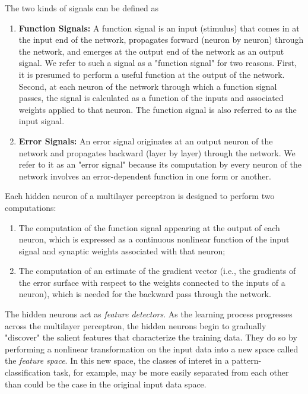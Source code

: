 \documentclass[twocolumn]{article}
\begin{document}
 The two kinds of signals can be defined as

 \begin{enumerate}
	 \item \textbf{Function Signals:} A function signal is an input (stimulus) that comes in at the input end of the network, propagates forward (neuron by neuron) through the network, and emerges at the output end of the network as an output signal. We refer to such a signal as a "function signal" for two reasons. First, it is presumed to perform a useful function at the output of the network. Second, at each neuron of the network through which a function signal passes, the signal is calculated as a function of the inputs and associated weights applied to that neuron. The function signal is also referred to as the input signal.
	 \item \textbf{Error Signals:} An error signal originates at an output neuron of the network and propagates backward (layer by layer) through the network. We refer to it as an "error signal" because its computation by every neuron of the network involves an error-dependent function in one form or another.
 \end{enumerate}

 Each hidden neuron of a multilayer perceptron is designed to perform two computations:

 \begin{enumerate}
	 \item The computation of the function signal appearing at the output of each neuron, which is expressed as a continuous nonlinear function of the input signal and synaptic weights associated with that neuron;
	 \item The computation of an estimate of the gradient vector (i.e., the gradients of the error surface with respect to the weights connected to the inputs of a neuron), which is needed for the backward pass through the network.
 \end{enumerate}

 The hidden neurons act as \textit{feature detectors}. As the learning process progresses across the multilayer perceptron, the hidden neurons begin to gradually "discover" the salient features that characterize the training data. They do so by performing a nonlinear transformation on the input data into a new space called the \textit{feature space}. In this new space, the classes of interet in a pattern-classification task, for example, may be more easily separated from each other than could be the case in the original input data space.
\end{document}
